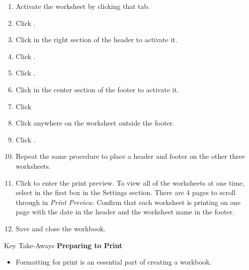 \begin{enumerate}[resume]
	\item Activate the  worksheet by clicking that tab. 
	\item Click .
	\item Click in the right section of the header to activate it. 
	\item Click .
	\item Click . 
	\item Click in the center section of the footer to activate it. 
	\item Click 
	\item Click anywhere on the worksheet outside the footer.
	\item Click .
	\item Repeat the same procedure to place a header and footer on the other three worksheets.
	\item Click  to enter the print preview. To view all of the worksheets at one time, select  in the first box in the Settings section. There are $ 4 $ pages to scroll through in \textit{Print Preview}. Confirm that each worksheet is printing on one page with the date in the header and the worksheet name in the footer.
	\item Save and close the  workbook.
\end{enumerate}

\begin{center}
	\begin{tkwbox}{Key Take-Aways}
		\textbf{Preparing to Print}
		\\
		\begin{itemize}
			\setlength{\itemsep}{0pt}
			\setlength{\parskip}{0pt}
			\setlength{\parsep}{0pt}
			
			\item Formatting for print is an essential part of creating a workbook.
			
		\end{itemize}
	\end{tkwbox}
\end{center}

